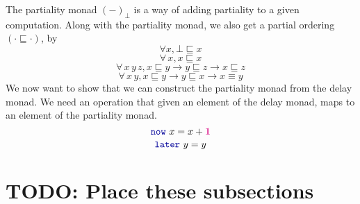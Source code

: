 \documentclass[twoside,11pt,openright]{report}
\theoremstyle{plain} %
\theoremstyle{definition}
\theoremstyle{remark}
\newcommand*{\type}[1]{\textcolor{magenta!90!black}{#1}}
\newcommand*{\unit}{\type{\textbf{1}}}
\newcommand*{\function}[1]{\textcolor{blue!60!black}{\ensuremath{\mathtt{#1}}}}
\begin{document}
The partiality monad \((-)_\bot\) is a way of adding partiality to a given computation. Along with the partiality monad, we also get a partial ordering \((\cdot \sqsubseteq \cdot)\), by
\begin{equation}
\forall x, \bot \sqsubseteq x
\end{equation}
\begin{equation}
\forall\,x, x \sqsubseteq x
\end{equation}
\begin{equation}
\forall\,x\,y\,z, x \sqsubseteq y \rightarrow y \sqsubseteq z \rightarrow x \sqsubseteq z
\end{equation}
\begin{equation}
\forall\,x\,y, x \sqsubseteq y \rightarrow y \sqsubseteq x \rightarrow x \equiv y
\end{equation}
We now want to show that we can construct the partiality monad from the delay monad. We need an operation that given an element of the delay monad, maps to an element of the partiality monad.
\begin{equation}
  \function{now}~x = x + \unit
\end{equation}
\begin{equation}
  \function{later}~y = y
\end{equation}

\section{TODO: Place these subsections}
\end{document}
